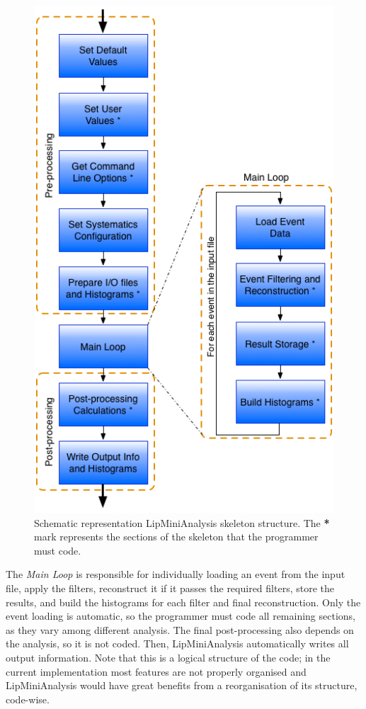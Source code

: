 \begin{figure}[!htp]
	\begin{center}
		\includegraphics[scale=0.5]{imgs/lipminianalysis.png}
		\caption{Schematic representation LipMiniAnalysis skeleton structure. The \textbf{*} mark represents the sections of the skeleton that the programmer must code.}
		\label{fig:lipmini}
	\end{center}
\end{figure}

The \textit{Main Loop} is responsible for individually loading an event from the input file, apply the filters, reconstruct it if it passes the required filters, store the results, and build the histograms for each filter and final reconstruction. Only the event loading is automatic, so the programmer must code all remaining sections, as they vary among different analysis. The final post-processing also depends on the analysis, so it is not coded. Then, LipMiniAnalysis automatically writes all output information. Note that this is a logical structure of the code; in the current implementation most features are not properly organised and LipMiniAnalysis would have great benefits from a reorganisation of its structure, code-wise.

